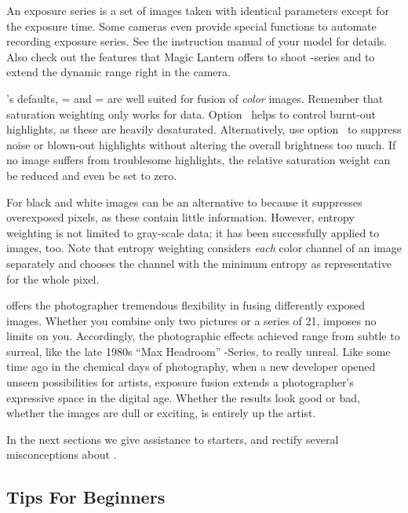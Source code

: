
An exposure series is a set of images taken with identical parameters
except for the exposure time.  Some cameras even provide special
functions to automate recording exposure series.  See the instruction
manual of your model for details.  Also check out the features that
Magic Lantern offers to shoot -series and to extend the
dynamic range right in the camera.

\App{}'s defaults,
= and
= are well
suited for fusion of \emph{color} images.  Remember that saturation
weighting only works for  data.
Option~ helps to control burnt-out
highlights, as these are heavily desaturated.  Alternatively, use
option~ to suppress noise or blown-out
highlights without altering the overall brightness too much.  If no
image suffers from troublesome highlights, the relative saturation
weight can be reduced and even be set to zero.

For black and white images  can be an
alternative to  because it suppresses
overexposed pixels, as these contain little information.  However,
entropy weighting is not limited to gray-scale data; it has been
successfully applied to  images, too.  Note that entropy
weighting considers \emph{each} color channel of an 
image separately and chooses the channel with the minimum entropy as
representative for the whole pixel.

\App{} offers the photographer tremendous flexibility in fusing
differently exposed images.  Whether you combine only two pictures or
a series of 21, \App{} imposes no limits on you.  Accordingly, the
photographic effects achieved range from subtle to surreal, like the
late 1980s ``Max Headroom'' -Series, to really unreal.
Like some time ago in the chemical days of photography, when a new
developer opened unseen possibilities for artists, exposure fusion
extends a photographer's expressive space in the digital age.  Whether
the results look good or bad, whether the images are dull or exciting,
is entirely up the artist.

In the next sections we give assistance to starters, and rectify
several misconceptions about \App{}.


\subsection[Tips For Beginners]{Tips For Beginners
  \label{sec:tips-for-beginners}
  }

